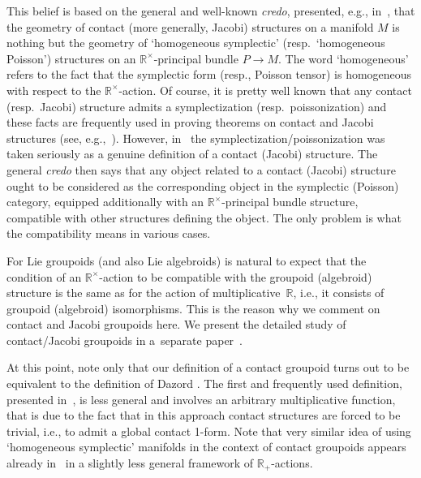 \documentclass[pdftex]{sigma}
\numberwithin{equation}{section}
\begin{document}
This belief is based on the general and well-known \emph{credo}, presented, e.g., in~\cite{Grabowski2013}, that the geometry of contact (more generally, Jacobi) structures on a manifold $M$ is nothing but the geometry of `homogeneous symplectic' (resp.\ `homogeneous Poisson') structures on an ${\mathbb R}^\times$-principal bundle $P\to M$. The word `homogeneous' refers to the fact that the symplectic form (resp., Poisson tensor) is homogeneous with respect to the ${\mathbb R}^\times$-action.
Of course, it is pretty well known that any contact (resp.\ Jacobi) structure admits a symplectization (resp.\ poissonization) and these facts are frequently used in proving  theorems on contact and Jacobi structures (see, e.g.,~\cite{Mehta:2013}). However, in~\cite{Grabowski2013} the symplectization/poissonization was taken seriously as a genuine def\/inition of a contact (Jacobi) structure. The general \emph{credo} then says that any object related to a contact (Jacobi) structure ought to be considered  as the corresponding object in the symplectic (Poisson) category, equipped additionally with an ${\mathbb R}^\times$-principal bundle structure, compatible with other structures def\/ining the object. The only problem is what the compatibility means in various cases.

For Lie groupoids (and also Lie algebroids) is natural to expect that the condition of an ${\mathbb R}^\times$-action to be compatible with the groupoid (algebroid) structure is the same as for the action of multiplicative~${\mathbb R}$, i.e., it consists of groupoid (algebroid) isomorphisms. This is the reason why we comment on contact and Jacobi groupoids here. We present the  detailed study of contact/Jacobi groupoids in a~separate paper~\cite{Bruce:2015}.

At this point, note only  that our def\/inition of a contact groupoid turns out to be equivalent to the def\/inition of Dazord \cite{Dazord:1995}. The f\/irst and frequently used def\/inition, presented in~\cite{Kerbrat:1993}, is less general and involves an arbitrary multiplicative function, that is due to the fact that in this approach contact structures are forced to be trivial, i.e., to admit a global contact 1-form. Note that very similar idea of using `homogeneous symplectic' manifolds in the context of contact groupoids appears already in~\cite{Crainic:2007} in a slightly less general framework of ${\mathbb R}_+$-actions.
\end{document}
